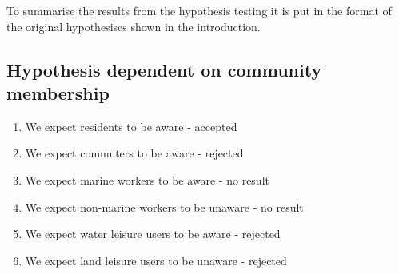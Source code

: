 To summarise the results from the hypothesis testing it is put in the format of the original hypothesises shown in the introduction. 

\subsection{Hypothesis dependent on community membership}
\begin{enumerate}
    \item We expect residents to be aware - accepted
    \item We expect commuters to be aware - rejected
    \item We expect marine workers to be aware - no result
    \item We expect non-marine workers to be unaware - no result
    \item We expect water leisure users to be aware - rejected
    \item We expect land leisure users to be unaware - rejected
    \end{enumerate}
\paragraph{}

